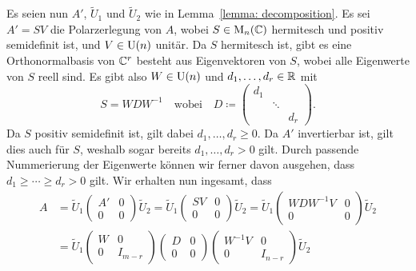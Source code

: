 Es seien nun $A'$, $\tilde{U}_1$ und $\tilde{U}_2$ wie in Lemma~\ref{lemma: decomposition}.
Es sei $A' = S V$ die Polarzerlegung von $A$, wobei $S \in \operatorname{M}_{n}(\mathbb{C})$ hermitesch und positiv semidefinit ist, und $V \in \operatorname{U}(n)$ unitär.
Da $S$ hermitesch ist, gibt es eine Orthonormalbasis von $\mathbb{C}^r$ besteht aus Eigenvektoren von $S$, wobei alle Eigenwerte von $S$ reell sind.
Es gibt also $W \in \operatorname{U}(n)$ und $d_1, \dotsc, d_r \in \mathbb{R}$ mit
\[
    S
  = W D W^{-1}
  \quad
  \text{wobei}
  \quad
              D
  \coloneqq   \begin{pmatrix}
                d_1 &         &     \\
                    & \ddots  &     \\
                    &         & d_r
              \end{pmatrix}.
\]
Da $S$ positiv semidefinit ist, gilt dabei $d_1, \dotsc, d_r \geq 0$.
Da $A'$ invertierbar ist, gilt dies auch für $S$, weshalb sogar bereits $d_1, \dotsc, d_r > 0$ gilt.
Durch passende Nummerierung der Eigenwerte können wir ferner davon ausgehen, dass $d_1 \geq \dotsb \geq d_r > 0$ gilt.
Wir erhalten nun ingesamt, dass
\begin{align*}
      A
  &=  \tilde{U}_1
      \begin{pmatrix}
        A'  & 0 \\
        0   & 0
      \end{pmatrix}
      \tilde{U}_2
    = \tilde{U}_1
      \begin{pmatrix}
        SV  & 0 \\
        0   & 0
      \end{pmatrix}
      \tilde{U}_2
    = \tilde{U}_1
      \begin{pmatrix}
        W D W^{-1} V  & 0 \\
        0             & 0
      \end{pmatrix}
      \tilde{U}_2
  \\
  &=  \tilde{U}_1
      \begin{pmatrix}
        W & 0       \\
        0 & I_{m-r}
      \end{pmatrix}
      \begin{pmatrix}
        D & 0 \\
        0 & 0
      \end{pmatrix}
      \begin{pmatrix}
        W^{-1} V  & 0       \\
        0         & I_{n-r}
      \end{pmatrix}
      \tilde{U}_2
\end{align*}
